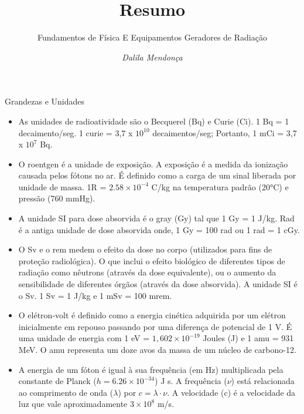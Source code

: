 \documentclass[11pt,a4paper]{article}
\title{Resumo}
\author{Fundamentos de Física E Equipamentos Geradores de Radiação \nocite{*}}
\date{\textit{Dalila Mendonça}}
\newcounter{exemplo}
\begin{document}
	\maketitle

\begin{exemplo}

    \textcolor{CarnationPink}{Grandezas e Unidades}

    \begin{itemize}
        \item As unidades de radioatividade são o Becquerel (Bq) e Curie (Ci). 1 Bq = 1 decaimento/seg. 1 curie = 3,7 x $10^{10}$ decaimentos/seg; Portanto, 1 mCi = 3,7 x $10^7$ Bq.
        
        \item O roentgen é a unidade de exposição. A exposição é a medida da ionização causada pelos fótons no ar. É definido como a carga de um sinal liberada por unidade de massa. 1R = $2.58 \times 10^{-4}$ C/kg na temperatura padrão (\ang{20}C) e pressão (760 mmHg).
        
        \item A unidade SI para dose absorvida é o gray (Gy) tal que 1 Gy = 1 J/kg. Rad é a antiga unidade de dose absorvida onde, 1 Gy = 100 rad ou 1 rad = 1 cGy.

        \item O Sv e o rem medem o efeito da dose no corpo (utilizados para fins de proteção radiológica). O que inclui o efeito biológico de diferentes tipos de radiação como nêutrons (através da dose equivalente), ou o aumento da sensibilidade de diferentes órgãos (através da dose absorvida). A unidade SI é o Sv. 1 Sv = 1 J/kg e 1 mSv = 100 mrem.

        \item O elétron-volt é definido como a energia cinética adquirida por um elétron inicialmente em repouso passando por uma diferença de potencial de 1 V. É uma unidade de energia com 1 eV = $1,602 \times 10^{-19}$ Joules (J) e 1 amu = 931 MeV. O amu representa um doze avos da massa de um núcleo de carbono-12.

        \item A energia de um fóton é igual à sua frequência (em Hz) multiplicada pela constante de Planck ($h = 6.26 \times 10^{-34} $) J s. A frequência ($\nu$) está relacionada ao comprimento de onda ($\lambda$) por  $c = \lambda \cdot \nu$. A velocidade (c) é a velocidade da luz que vale aproximadamente $3 \times 10^{8}$ m/s.
        

\end{itemize}
\end{exemplo}
\end{document}
